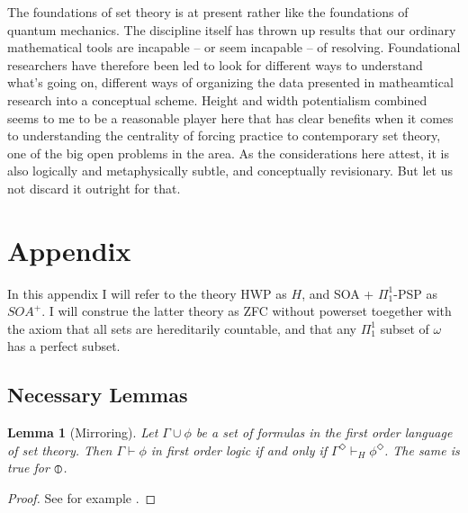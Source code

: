 \documentclass{article}
\newcommand\D{\circledbar}
\newtheorem{lemma}[theorem]{Lemma}
\begin{document}
The foundations of set theory is at present rather like the foundations 
of quantum mechanics. The discipline itself has thrown up results that our 
ordinary mathematical tools are incapable -- or seem incapable -- of resolving.
Foundational researchers have therefore been led to look for different ways 
to understand what's going on, different ways of organizing the data presented 
in matheamtical research into a conceptual scheme. Height and width potentialism 
combined seems to me to be a reasonable player here that has clear benefits when it 
comes to understanding the centrality of forcing practice to contemporary 
set theory, one of the big open problems in the area. As the considerations 
here attest, it is also logically and metaphysically subtle, 
and conceptually revisionary. But let 
us not discard it outright for that.

\section*{Appendix}
In this appendix I will refer to the theory HWP as $H$, and SOA + $\Pi_1^1$-PSP as $SOA^+$.
I will construe the latter theory as ZFC without powerset toegether with the axiom that 
all sets are hereditarily countable, and that any $\Pi_1^1$ subset of $\omega$ 
has a perfect subset.
\subsection*{Necessary Lemmas}
\begin{lemma}[Mirroring]
    Let $\Gamma 
    \cup {\phi}$ be a set of formulas in the first order language of set theory. Then
    $\Gamma \vdash \phi$ in first order logic if and only if 
    $\Gamma^\Diamond \vdash_{H}\phi^\Diamond$. 
    The same is true for $\D$.
\end{lemma}
\begin{proof}
    See for example \cite[Chapter 12]{OL2018}.
\end{proof}
\end{document}
